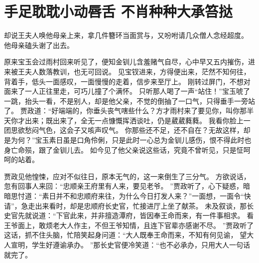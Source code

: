 \chapter{手足耽耽小动唇舌 \quad 不肖种种大承笞挞}
\par
{}\par
却说王夫人唤他母亲上来，拿几件簪环当面赏与，又吩咐请几众僧人念经超度。
他母亲磕头谢了出去。
\par
原来宝玉会过雨村回来听见了，便知金钏儿含羞赌气自尽，心中早又五内摧伤，进来被王夫人数落教训，也无可回说。
见宝钗进来，方得便出来，茫然不知何往，背着手，低头一面感叹，一面慢慢的走着，信步来至厅上。
刚转过屏门，不想对面来了一人正往里走，可巧儿撞了个满怀。
只听那人喝了一声“站住！”宝玉唬了一跳，抬头一看，不是别人，却是他父亲，不觉的倒抽了一口气，只得垂手一旁站了。
贾政道：“好端端的，你垂头丧气嗐些什么？方才雨村来了要见你，叫你那半天你才出来；既出来了，全无一点慷慨挥洒谈吐，仍是葳葳蕤蕤。
我看你脸上一团思欲愁闷气色，这会子又咳声叹气。
你那些还不足，还不自在？无故这样，却是为何？”宝玉素日虽是口角伶俐，只是此时一心总为金钏儿感伤，恨不得此时也身亡命殒，跟了金钏儿去。
如今见了他父亲说这些话，究竟不曾听见，只是怔呵呵的站着。
\par
贾政见他惶悚，应对不似往日，原本无气的，这一来倒生了三分气。
方欲说话，忽有回事人来回：“忠顺亲王府里有人来，要见老爷。
”贾政听了，心下疑惑，暗暗思忖道：“素日并不和忠顺府来往，为什么今日打发人来？”一面想，一面令“快请”，急走出来看时，却是忠顺府长史官，忙接进厅上坐了献茶。
未及叙谈，那长史官先就说道：“下官此来，并非擅造潭府，皆因奉王命而来，有一件事相求。
看王爷面上，敢烦老大人作主，不但王爷知情，且连下官辈亦感谢不尽。
”贾政听了这话，抓不住头脑，忙陪笑起身问道：“大人既奉王命而来，不知有何见谕，
望大人宣明，学生好遵谕承办。
”那长史官便冷笑道：“也不必承办，只用大人一句话就完了。
